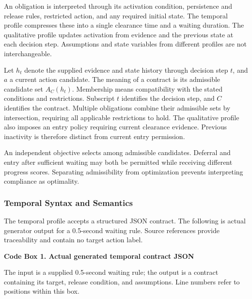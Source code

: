 \documentclass[nolineno]{ieeeaccess}
\begin{document}
An obligation is interpreted through its activation condition, persistence and release rules, restricted action, and any required initial state. The temporal profile compresses these into a single clearance time and a waiting duration. The qualitative profile updates activation from evidence and the previous state at each decision step. Assumptions and state variables from different profiles are not interchangeable.\par

Let $h_t$ denote the supplied evidence and state history through decision step $t$, and $a$ a current action candidate. The meaning of a contract is its admissible candidate set $A_C(h_t)$. Membership means compatibility with the stated conditions and restrictions. Subscript $t$ identifies the decision step, and $C$ identifies the contract. Multiple obligations combine their admissible sets by intersection, requiring all applicable restrictions to hold. The qualitative profile also imposes an entry policy requiring current clearance evidence. Previous inactivity is therefore distinct from current entry permission.\par

An independent objective selects among admissible candidates. Deferral and entry after sufficient waiting may both be permitted while receiving different progress scores. Separating admissibility from optimization prevents interpreting compliance as optimality.\par

\subsubsection{Temporal Syntax and Semantics}

The temporal profile accepts a structured JSON contract. The following is actual generator output for a 0.5-second waiting rule. Source references provide traceability and contain no target action label.\par

\textbf{Code Box 1. Actual generated temporal contract JSON}\par

The input is a supplied 0.5-second waiting rule; the output is a contract containing its target, release condition, and assumptions. Line numbers refer to positions within this box.\par
\end{document}
